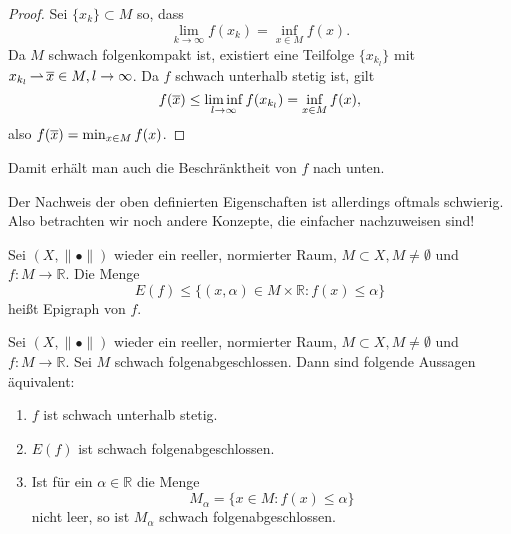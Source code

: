 \documentclass[main.tex]{subfiles}
\begin{document}
\begin{proof}
Sei $\{x_k\}\subset M$ so, dass
$$\lim_{k\to \infty} f(x_k) = \inf_{x\in M} f(x).$$
Da $M$ schwach folgenkompakt ist, existiert eine Teilfolge $\{x_{k_l}\}$ mit $x_{k_l}\operatorname{\rightharpoonup} \overline x\in M, l\to \infty$. Da $f$ schwach unterhalb stetig ist, gilt
$$f(\overline x) \le \liminf_{l\to \infty} f(x_{k_l}) = \inf_{x\in M} f(x),$$
also $f(\overline x) = \min_{x\in M} f(x)$.
\end{proof}

\begin{folge}
Damit erhält man auch die Beschränktheit von $f$ nach unten.
\end{folge}
Der Nachweis der oben definierten Eigenschaften ist allerdings oftmals schwierig. Also betrachten wir noch andere Konzepte, die einfacher nachzuweisen sind!

\begin{mydef}\label{2.4}
Sei $(X, \|•\|)$ wieder ein reeller, normierter Raum, $M\subset X, M\ne ∅$ und $f\colon M\to ℝ$. Die Menge 
$$E(f) \le \{(x,α) \in M \times ℝ : f(x)\le α \}$$
heißt Epigraph von $f$.
\end{mydef}


\begin{satz}\label{2.5}
Sei $(X, \|•\|)$ wieder ein reeller, normierter Raum, $M\subset X, M\ne ∅$ und $f\colon M\to ℝ$. Sei $M$ schwach folgenabgeschlossen. Dann sind folgende Aussagen äquivalent:
\begin{enumerate}[label=\roman*)]
    \item \label{2.5.1} $f$ ist schwach unterhalb stetig.
    \item \label{2.5.2} $E(f)$ ist schwach folgenabgeschlossen.
    \item \label{2.5.3} Ist für ein $α\in ℝ$ die Menge
    $$M_α = \{ x\in M: f(x)\le α \}$$
    nicht leer, so ist $M_α$ schwach folgenabgeschlossen.
\end{enumerate}
\end{satz}
\end{document}
